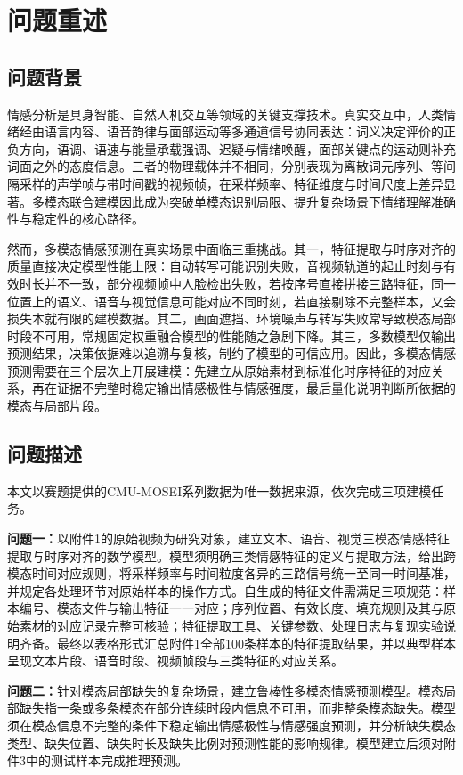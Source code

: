 \section{问题重述}
\subsection{问题背景}
情感分析是具身智能、自然人机交互等领域的关键支撑技术。真实交互中，人类情绪经由语言内容、语音韵律与面部运动等多通道信号协同表达：词义决定评价的正负方向，语调、语速与能量承载强调、迟疑与情绪唤醒，面部关键点的运动则补充词面之外的态度信息。三者的物理载体并不相同，分别表现为离散词元序列、等间隔采样的声学帧与带时间戳的视频帧，在采样频率、特征维度与时间尺度上差异显著。多模态联合建模因此成为突破单模态识别局限、提升复杂场景下情绪理解准确性与稳定性的核心路径。

然而，多模态情感预测在真实场景中面临三重挑战。其一，特征提取与时序对齐的质量直接决定模型性能上限：自动转写可能识别失败，音视频轨道的起止时刻与有效时长并不一致，部分视频帧中人脸检出失败，若按序号直接拼接三路特征，同一位置上的语义、语音与视觉信息可能对应不同时刻，若直接剔除不完整样本，又会损失本就有限的建模数据。其二，画面遮挡、环境噪声与转写失败常导致模态局部时段不可用，常规固定权重融合模型的性能随之急剧下降。其三，多数模型仅输出预测结果，决策依据难以追溯与复核，制约了模型的可信应用。因此，多模态情感预测需要在三个层次上开展建模：先建立从原始素材到标准化时序特征的对应关系，再在证据不完整时稳定输出情感极性与情感强度，最后量化说明判断所依据的模态与局部片段。

\subsection{问题描述}
本文以赛题提供的CMU-MOSEI系列数据为唯一数据来源，依次完成三项建模任务。

\textbf{问题一：}以附件1的原始视频为研究对象，建立文本、语音、视觉三模态情感特征提取与时序对齐的数学模型。模型须明确三类情感特征的定义与提取方法，给出跨模态时间对应规则，将采样频率与时间粒度各异的三路信号统一至同一时间基准，并规定各处理环节对原始样本的操作方式。自生成的特征文件需满足三项规范：样本编号、模态文件与输出特征一一对应；序列位置、有效长度、填充规则及其与原始素材的对应记录完整可核验；特征提取工具、关键参数、处理日志与复现实验说明齐备。最终以表格形式汇总附件1全部100条样本的特征提取结果，并以典型样本呈现文本片段、语音时段、视频帧段与三类特征的对应关系。

\textbf{问题二：}针对模态局部缺失的复杂场景，建立鲁棒性多模态情感预测模型。模态局部缺失指一条或多条模态在部分连续时段内信息不可用，而非整条模态缺失。模型须在模态信息不完整的条件下稳定输出情感极性与情感强度预测，并分析缺失模态类型、缺失位置、缺失时长及缺失比例对预测性能的影响规律。模型建立后须对附件3中的测试样本完成推理预测。

